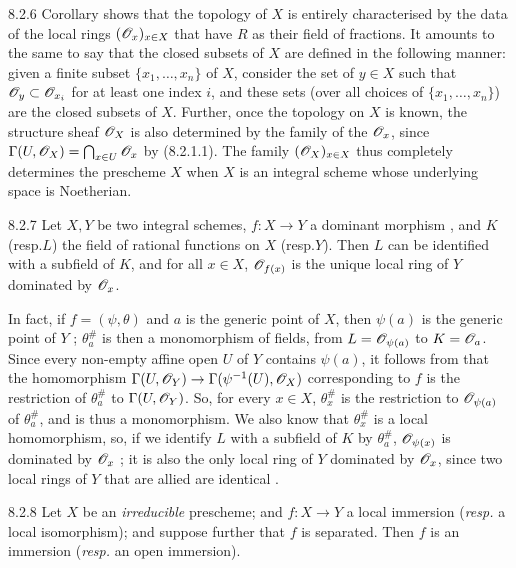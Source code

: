 \documentclass[10pt,oneside]{book}
\begin{document}
\begin{env}{8.2.6}
\label{env-1.8.2.6}
Corollary  shows that the topology of $X$ is
entirely characterised by the data of the local rings $(\mathscr{O}_x)_{x\in X}$ that
have $R$ as their field of fractions. It amounts to the same to say that the
closed subsets of $X$ are defined in the following manner: given a finite subset
$\{x_1,\ldots,x_n\}$ of $X$, consider the set of $y\in X$ such that
$\mathscr{O}_y\subset\mathscr{O}_{x_i}$ for at least one index $i$, and these sets (over all
choices of $\{x_1,\ldots,x_n\}$) are the closed subsets of $X$. Further, once
the topology on $X$ is known, the structure sheaf $\mathscr{O}_X$ is also determined by
the family of the $\mathscr{O}_x$, since $\Gamma(U,\mathscr{O}_X)=\bigcap_{x\in U}\mathscr{O}_x$ by
(8.2.1.1). The family $(\mathscr{O}_X)_{x\in X}$ thus completely determines the
prescheme $X$ when $X$ is an integral scheme whose underlying space is
Noetherian.
\end{env}

\begin{envs}[Proposition]{8.2.7}
\label{prop-1.8.2.7}
Let $X,Y$ be two integral schemes, $f:X\to Y$ a dominant morphism
, and $K$ (resp.$L$) the field of rational
functions on $X$ (resp.$Y$). Then $L$ can be identified with a subfield of
$K$, and for all $x\in X$, $\mathscr{O}_{f(x)}$ is the unique local ring of $Y$ dominated
by $\mathscr{O}_x$.
\end{envs}

In fact, if $f=(\psi,\theta)$ and $a$ is the generic point of $X$, then
$\psi(a)$ is the generic point of $Y$ ; $\theta_a^\#$ is then
a monomorphism of fields, from $L=\mathscr{O}_{\psi(a)}$ to $K=\mathscr{O}_a$. Since every
non-empty affine open $U$ of $Y$ contains $\psi(a)$, it follows from
 that the homomorphism $\Gamma(U,\mathscr{O}_Y)\to\Gamma(\psi^{-1}(U),\mathscr{O}_X)$
corresponding to $f$ is the restriction of $\theta_a^\#$ to $\Gamma(U,\mathscr{O}_Y)$.
So, for every $x\in X$, $\theta_x^\#$ is the restriction to $\mathscr{O}_{\psi(a)}$ of
$\theta_a^\#$, and is thus a monomorphism. We also know that $\theta_x^\#$ is a
local homomorphism, so, if we identify $L$ with a subfield of $K$ by
$\theta_a^\#$, $\mathscr{O}_{\psi(x)}$ is dominated by $\mathscr{O}_x$ ; it is also
the only local ring of $Y$ dominated by $\mathscr{O}_x$, since two local rings of $Y$
that are allied are identical .

\begin{envs}[Proposition]{8.2.8}
\label{prop-1.8.2.8}
Let $X$ be an \emph{irreducible} prescheme; and
$f:X\to Y$ a local immersion (\emph{resp.} a local isomorphism); and
suppose further that $f$ is separated. Then $f$ is an immersion (\emph{resp.}
an open immersion).
\end{envs}
\end{document}
